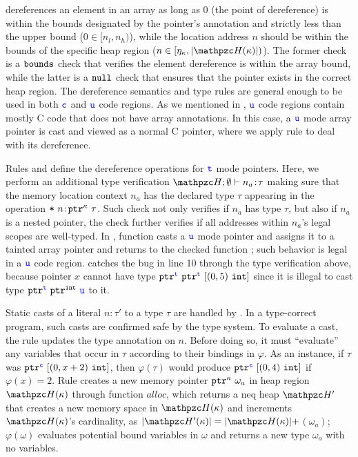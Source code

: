  dereferences an element in an array as long as $0$ (the point of
dereference) is within the bounds designated by the pointer's annotation
and strictly less than the upper bound ($0 \in [n_l,n_h)$),
while the location address $n$ should be within the bounds of the specific heap region ($n\in[\eta_{\kappa},|\heap(\kappa)|)$).
The former check is a $\mathtt{bounds}$ check that verifies the element dereference is within the array bound,
while the latter is a $\mathtt{null}$ check that ensures that the pointer exists in the correct heap region.
The dereference semantics and type rules are general enough to be used in both $\textcolor{blue}{\texttt{c}}$ and $\textcolor{blue}{\texttt{u}}$ code regions.
As we mentioned in , $\textcolor{blue}{\texttt{u}}$ code regions contain mostly C code that does not have array annotations.
In this case, a $\textcolor{blue}{\texttt{u}}$ mode array pointer is cast and viewed as a normal C pointer, where we apply rule  to deal with its dereference.

Rules  and  define the dereference operations for $\textcolor{blue}{\texttt{t}}$ mode pointers.
Here, we perform an additional type verification $\heap;\emptyset \vdash \evalue{n_a}{\tau}$ making sure that the memory location context $n_a$ has the declared type $\tau$ appearing in the operation $\texttt{*}~{{n}\!:\!{\mathtt{ptr}^{\kappa}~{\tau}}}$.
Such check not only verifies if $n_a$ has type $\tau$, but also if $n_a$ is a nested pointer,
the check further verifies if all addresses within $n_a$'s legal scopes are well-typed.
In , function  casts a $\textcolor{blue}{\texttt{u}}$ mode pointer and assigns it to a tainted array pointer and returns to the checked function ; such behavior is legal in a $\textcolor{blue}{\texttt{u}}$ code region. 
 catches the bug in line 10 through the type verification above, because pointer $x$ cannot have type $\mathtt{ptr}^{\textcolor{blue}{\texttt{t}}}~{{\mathtt{ptr}^{\textcolor{blue}{\texttt{t}}}~{[{({0},{5})}~{\mathtt{int}}]}}}$ since it is illegal to cast type $\mathtt{ptr}^{\textcolor{blue}{\texttt{t}}}~{\mathtt{ptr}^{\mathtt{int}}~{\textcolor{blue}{\texttt{u}}}}$ to it.

Static casts of a literal $n\!:\!\tau'$ to a type $\tau$ are handled
by . In a type-correct program, such casts are
confirmed safe by the type system. To evaluate a cast, the rule
updates the type annotation on $n$. Before doing so, it must
``evaluate'' any variables that occur in $\tau$ according to their
bindings in $\varphi$. As an instance, if $\tau$ was
${\mathtt{ptr}^{\textcolor{blue}{\texttt{c}}}~{[{({0},{x+2})}~{\mathtt{int}}]}}$, then $\varphi(\tau)$ would
produce ${\mathtt{ptr}^{\textcolor{blue}{\texttt{c}}}~{[{({0},{4})}~{\mathtt{int}}]}}$ if $\varphi(x) = 2$.
Rule  creates a new memory pointer $\mathtt{ptr}^{\kappa}~{\omega_a}$
in heap region $\heap(\kappa)$ through function $alloc$, which returns a neq heap $\heap'$ that creates a new memory space in $\heap(\kappa)$ and increments $\heap(\kappa)$'s cardinality, as $|\heap'(\kappa)|=|\heap(\kappa)|+$$(\omega_a)$;
$\varphi(\omega)$ evaluates potential bound variables in $\omega$ and returns a new type $\omega_a$ with no variables.


